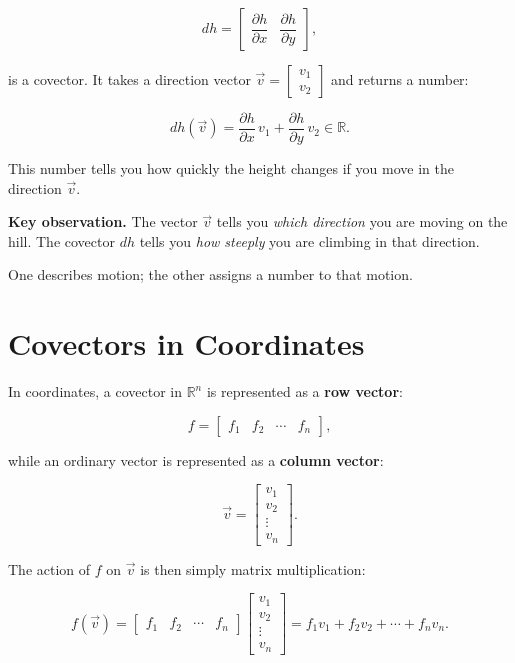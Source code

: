 \documentclass[11pt,openany]{book}
\theoremstyle{definition}
\begin{document}
\[
dh = \begin{bmatrix} \dfrac{\partial h}{\partial x} & \dfrac{\partial h}{\partial y} \end{bmatrix},
\]

is a covector. It takes a direction vector $\vec{v} = \begin{bmatrix} v_1 \\ v_2 \end{bmatrix}$ 
and returns a number:

\[
dh(\vec{v}) = \frac{\partial h}{\partial x}\,v_1 + \frac{\partial h}{\partial y}\,v_2 \in \mathbb{R}.
\]

\medskip

This number tells you how quickly the height changes if you move in the direction $\vec{v}$.

\medskip

\textbf{Key observation.} The vector $\vec{v}$ tells you \textit{which direction} you are moving 
on the hill. The covector $dh$ tells you \textit{how steeply} you are climbing in that direction.

\medskip

One describes motion; the other assigns a number to that motion.

\medskip

\section{Covectors in Coordinates}

In coordinates, a covector in $\mathbb{R}^n$ is represented as a \textbf{row vector}:

\[
f = \begin{bmatrix} f_1 & f_2 & \cdots & f_n \end{bmatrix},
\]

while an ordinary vector is represented as a \textbf{column vector}:

\[
\vec{v} =
\begin{bmatrix}
v_1 \\
v_2 \\
\vdots \\
v_n
\end{bmatrix}.
\]

\medskip

The action of $f$ on $\vec{v}$ is then simply matrix multiplication:

\[
f(\vec{v}) =
\begin{bmatrix} f_1 & f_2 & \cdots & f_n \end{bmatrix}
\begin{bmatrix} v_1 \\ v_2 \\ \vdots \\ v_n \end{bmatrix}
= f_1 v_1 + f_2 v_2 + \cdots + f_n v_n.
\]
\end{document}

